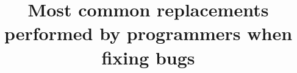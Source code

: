 \documentclass{sig-alternate-05-2015}
\begin{document}






%

\title{Most common replacements performed by programmers when fixing bugs}

%
%
%
%
%
\end{document}
